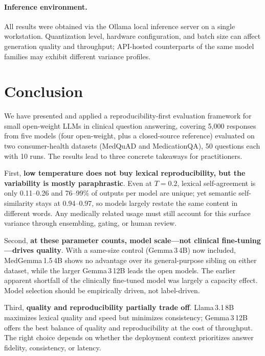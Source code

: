 \documentclass[11pt]{article}
\begin{document}
\paragraph{Inference environment.}
All results were obtained via the Ollama local inference server on a
single workstation.
Quantization level, hardware configuration, and batch size can affect
generation quality and throughput; API-hosted counterparts of the same
model families may exhibit different variance profiles.

\section{Conclusion}

We have presented and applied a reproducibility-first evaluation
framework for small open-weight LLMs in clinical question answering,
covering 5,000 responses from five models (four open-weight, plus a
closed-source reference) evaluated on two consumer-health datasets
(MedQuAD and MedicationQA), 50 questions each with 10 runs.
The results lead to three concrete takeaways for practitioners.

First, \textbf{low temperature does not buy lexical reproducibility, but
the variability is mostly paraphrastic}.
Even at $T{=}0.2$, lexical self-agreement is only 0.11--0.26 and
76--99\% of outputs per model are unique; yet semantic self-similarity
stays at 0.94--0.97, so models largely restate the same content in
different words. Any medically related usage must still account for this
surface variance through ensembling, gating, or human review.

Second, \textbf{at these parameter counts, model scale---not clinical
fine-tuning---drives quality}.
With a same-size control (Gemma\,3\,4B) now included, MedGemma\,1.5\,4B
shows no advantage over its general-purpose sibling on either dataset,
while the larger Gemma\,3\,12B leads the open models. The earlier
apparent shortfall of the clinically fine-tuned model was largely a
capacity effect. Model selection should be empirically driven, not
label-driven.

Third, \textbf{quality and reproducibility partially trade off}.
Llama\,3.1\,8B maximizes lexical quality and speed but minimizes
consistency; Gemma\,3\,12B offers the best balance of quality and
reproducibility at the cost of throughput.
The right choice depends on whether the deployment context prioritizes
answer fidelity, consistency, or latency.
\end{document}

